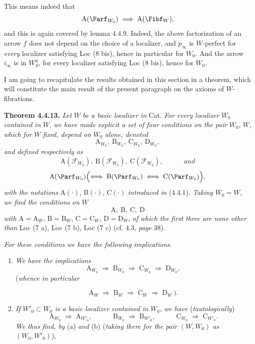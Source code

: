 This means indeed that
\[
\mathrm{A}(\Parf_{W_0}) \;\Longrightarrow\; \mathrm{A}(\Fibf_W),
\]
and this is again covered by lemma 4.4.9. Indeed, the above factorization of an arrow $f$ does not depend on the choice of a localizer, and $p_\infty$ is $W$-perfect for \textit{every} localizer satisfying Loc (8 bis), hence in particular for $W_0$. And the arrow $i_\infty$ is in $W^{\mathrm{u}}_S$, for every localizer satisfying Loc (8 bis), hence for $W_0$.

I am going to recapitulate the results obtained in this section in a theorem, which will constitute the main result of the present paragraph on the axioms of $W$-fibrations.

\textbf{Theorem 4.4.13.} \textit{Let} $W$ \textit{be a basic localizer in} Cat. \textit{For every localizer} $W_0$ \textit{contained in} $W$, \textit{we have made explicit a set of four conditions on the pair} $W_0$, $W$, \textit{which for} $W$ \textit{fixed, depend on} $W_0$ \textit{alone, denoted}
\[
\mathrm{A}_{W_0},\ \mathrm{B}_{W_0},\ \mathrm{C}_{W_0},\ \mathrm{D}_{W_0},
\tag*{(4.4.13.1)}
\]
\textit{and defined respectively as}
\[
\mathrm{A}(\mathcal{F}_{W_0}),\ \mathrm{B}(\mathcal{F}_{W_0}),\ \mathrm{C}(\mathcal{F}_{W_0}), \qquad\quad \textit{and}
\]
\[
\mathrm{A}(\Parf_{W_0}) \Bigl(\Longleftrightarrow\; \mathrm{B}(\Parf_{W_0}) \;\Longleftrightarrow\; \mathrm{C}(\Parf_{W_0})\Bigr),
\]
\textit{with the notations} $\mathrm{A}(\cdot)$, $\mathrm{B}(\cdot)$, $\mathrm{C}(\cdot)$ \textit{introduced in} (4.4.1). \textit{Taking} $W_0 = W$, \textit{we find the conditions on} $W$
\[
\mathrm{A},\ \mathrm{B},\ \mathrm{C},\ \mathrm{D}
\tag*{(4.4.13.2)}
\]
\textit{with} $\mathrm{A} = \mathrm{A}_W$, $\mathrm{B} = \mathrm{B}_W$, $\mathrm{C} = \mathrm{C}_W$, $\mathrm{D} = \mathrm{D}_W$, \textit{of which the first three are none other than} Loc (7 a), Loc (7 b), Loc (7 c) (cf. 4.3, \textit{page} 38).

 \textit{For these conditions we have the following implications.}

\begin{enumerate}[leftmargin=2.5em]
\item[a)] \textit{We have the implications}
\[
\mathrm{A}_{W_0} \;\Longrightarrow\; \mathrm{B}_{W_0} \;\Longrightarrow\; \mathrm{C}_{W_0} \;\Longrightarrow\; \mathrm{D}_{W_0},
\tag*{(4.4.13.3)}
\]
(\textit{whence in particular}

\[
\mathrm{A}_W \;\Longrightarrow\; \mathrm{B}_W \;\Longrightarrow\; \mathrm{C}_W \;\Longrightarrow\; \mathrm{D}_W\ ).
\tag*{(4.4.13.4)}
\]
\item[b)] \textit{If} $W'_0 \subset W_0$ \textit{is a basic localizer contained in} $W_0$, \textit{we have} (\textit{tautologically})
\[
\mathrm{A}_{W_0} \;\Longrightarrow\; \mathrm{A}_{W'_0}, \qquad\quad \mathrm{B}_{W_0} \;\Longrightarrow\; \mathrm{B}_{W'_0}, \qquad\quad \mathrm{C}_{W_0} \;\Longrightarrow\; \mathrm{C}_{W'_0}.
\]
\textit{We thus find, by} (a) \textit{and} (b) (\textit{taking there for the pair} $(W, W_0)$ \textit{as} $(W_0, W'_0)$),
\end{enumerate}
